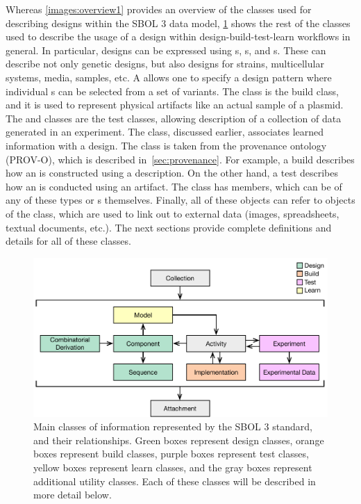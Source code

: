 Whereas \ref{images:overview1} provides an overview of the classes used for describing designs within the SBOL 3 data model,  \ref{images:overview2} shows the rest of the classes used to describe the usage of a design within design-build-test-learn workflows in general.
In particular, designs can be expressed using s, s, and s.
These can describe not only genetic designs, but also designs for strains, multicellular systems, media, samples, etc.
A  allows one to specify a design pattern where individual s can be selected from a set of variants.  
The  class is the build class, and it is used to represent physical artifacts like an actual sample of a plasmid.  
The  and  classes are the test classes, allowing description of a collection of data generated in an experiment.  
The  class, discussed earlier, associates learned information with a design.
The  class is taken from the provenance ontology (PROV-O), which is described in~\ref{sec:provenance}.  For example, a build  describes how an  is constructed using a  description.  On the other hand, a test  describes how an  is conducted using an  artifact.  The  class has members, which can be of any of these types or s themselves.  
Finally, all of these objects can refer to objects of the  class, which are used to link out to external data (images, spreadsheets, textual documents, etc.). 
The next sections provide complete definitions and details for all of these classes.

\begin{figure}[ht]
\begin{center}
\includegraphics[scale=0.85]{images/SBOL3-top-levels.pdf}
\caption{Main classes of information represented by the SBOL 3 standard, and their relationships.  Green boxes represent design classes, orange boxes represent build classes, purple boxes represent test classes, yellow boxes represent learn classes, and the gray boxes represent additional utility classes.  Each of these classes will be described in more detail below.}
\label{images:overview2}
\end{center}
\end{figure}
